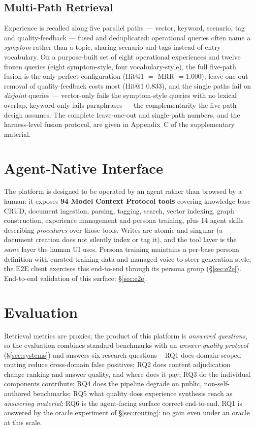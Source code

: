 \documentclass[sigconf, review, anonymous]{acmart}
\begin{document}
\subsection{Multi-Path Retrieval}
Experience is recalled along five parallel paths --- vector, keyword,
scenario, tag and quality-feedback --- fused and deduplicated: operational
queries often name a \emph{symptom} rather than a topic, sharing scenario and
tags instead of entry vocabulary. On a purpose-built set of eight operational
experiences and twelve frozen queries (eight symptom-style, four
vocabulary-style), the full five-path fusion is the only perfect
configuration (Hit@1 $=$ MRR $= 1.000$); leave-one-out removal of
quality-feedback costs most (Hit@1 $0.833$), and the single paths fail on
\emph{disjoint} queries --- vector-only fails the symptom-style queries with
no lexical overlap, keyword-only fails paraphrases --- the complementarity
the five-path design assumes. The complete leave-one-out and single-path
numbers, and the harness-level fusion protocol, are given in
Appendix~C of the supplementary material.

\section{Agent-Native Interface}\label{sec:agent}

The platform is designed to be operated by an agent rather than browsed by a
human: it exposes \textbf{94 Model Context Protocol tools} covering
knowledge-base CRUD, document ingestion, parsing, tagging, search, vector
indexing, graph construction, experience management and persona training, plus
14 agent skills describing \emph{procedures} over those tools. Writes are
atomic and singular (a document creation does not silently index or tag it),
and the tool layer is the \emph{same} layer the human UI uses. Persona
training maintains a per-base persona definition with curated training data
and managed voice to steer generation style; the E2E client exercises this
end-to-end through its persona group (\S\ref{sec:e2e}).
End-to-end
validation of this surface: \S\ref{sec:e2e}.

\section{Evaluation}\label{sec:eval}

Retrieval metrics are proxies; the product of this platform is \emph{answered
questions}, so the evaluation combines standard benchmarks with an
\emph{answer-quality protocol} (\S\ref{sec:systems}) and answers six research
questions -- RQ1 does domain-scoped routing reduce cross-domain false
positives; RQ2 does content adjudication change ranking and answer quality,
and where does it pay; RQ3 do the individual components contribute; RQ4 does
the pipeline degrade on public, non-self-authored benchmarks; RQ5 what quality
does experience synthesis reach as \emph{answering material}; RQ6 is the
agent-facing surface correct end-to-end. RQ1 is answered by the oracle
experiment of \S\ref{sec:routing}: no gain even under an oracle at this scale.
\end{document}
